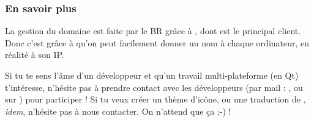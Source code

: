 \subsubsection{En savoir plus}

La gestion du domaine  est faite par le BR grâce à ,
dont  est le principal client. Donc c'est grâce à  qu'on peut facilement
donner un nom à chaque ordinateur, en réalité à son IP.

Si tu te sens l'âme d'un développeur et qu'un travail multi-plateforme (en Q{}t) t'intéresse, n'hésite pas à prendre contact avec les développeurs (par
mail : , ou sur ) pour participer ! Si tu veux créer un thème d'icône, ou une traduction de
, \emph{idem}, n'hésite pas à nous contacter. On n'attend que ça ;-) !
